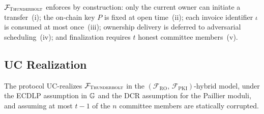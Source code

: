 \medskip\noindent
$\mathcal{F}_{\textsc{Thunderbolt}}$ enforces by construction:
only the current owner can initiate a transfer~(i);
the on-chain key $P$ is fixed at open time~(ii);
each invoice identifier $\iota$ is consumed at most once~(iii);
ownership delivery is deferred to adversarial scheduling~(iv);
and finalization requires $t$ honest committee members~(v).

\subsection{UC Realization}\label{sec:uc-realization}

\begin{theorem}\label{thm:uc-realization}
The \thunderbolt protocol UC-realizes $\mathcal{F}_{\textsc{Thunderbolt}}$ in the
$(\mathcal{F}_{\mathrm{RO}},\, \mathcal{F}_{\mathrm{PKI}})$-hybrid model, under the ECDLP assumption
in $\mathbb{G}$ and the DCR assumption for the Paillier moduli, and assuming at most $t-1$ of the $n$
committee members are statically corrupted.
\end{theorem}

